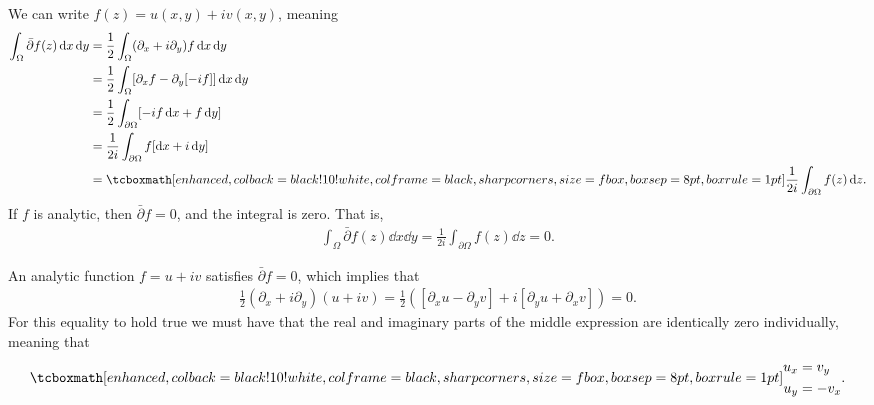 We can write $f(z) = u(x,y) + iv(x,y)$, meaning
\begin{align}
    \label{eq:int-rewrite}
    \int_{\Omega} \bar{\partial}f(z) \dd{x}\dd{y} &= \frac{1}{2} \int_{\Omega} (\partial_{x} + i \partial_{y})f \dd{x}\dd{y} \notag \\
    &= \frac{1}{2} \int_{\Omega} [\partial_{x} f - \partial_{y} [-if]] \dd{x}\dd{y} \notag \\
    &= \frac{1}{2} \int_{\partial \Omega} [-if \dd{x} + f\dd{y}] \notag \\
    &= \frac{1}{2i} \int_{\partial \Omega} f[\dd{x} + i\dd{y}] \notag \\
    &= \eqbox{ \frac{1}{2i} \int_{\partial \Omega} f(z) \dd{z} }
.\end{align}
If $f$ is analytic, then $\bar{\partial}f = 0$, and the integral is zero.
That is,
\begin{eqnarray}
    \label{eq:closed-loop-integral}
    \int_{\Omega} \bar{\partial}f(z) \dd{x}\dd{y} = \frac{1}{2i} \int_{\partial \Omega} f(z) \dd{z} = 0
.\end{eqnarray}




An analytic function $f = u + iv$ satisfies $\bar{\partial}f = 0$, which implies that
\begin{eqnarray}
    \label{eq:implication-1}
    \frac{1}{2}(\partial_{x} + i \partial_{y})(u+iv) = \frac{1}{2}([\partial_{x} u - \partial_{y}v] + i [\partial_{y}u + \partial_{x}v]) = 0
.\end{eqnarray}
For this equality to hold true we must have that the real and imaginary parts of the middle expression are identically zero individually, meaning that
\begin{eqnarray}
    \label{eq:Cauchy-Riemann}
    \eqbox{
    \begin{aligned}
        u_{x} &= v_{y} \\
        u_{y} &= -v_{x}
    \end{aligned} 
}
.\end{eqnarray}




